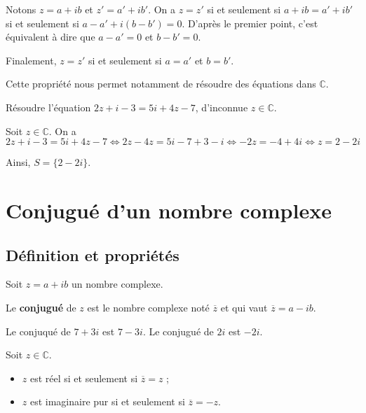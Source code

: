 \documentclass[11pt,fleqn, openany]{book} %
\begin{document}
\begin{demonstration}Notons $z=a+ib$ et $z'=a'+ib'$. On a $z=z'$ si et seulement si $a+ib=a'+ib'$ si et seulement si $a-a'+i(b-b')=0$. D'après le premier point, c'est équivalent à dire que $a-a'=0$ et $b-b'=0$. 

Finalement, $z=z'$ si et seulement si $a=a'$ et $b=b'$.\end{demonstration}

Cette propriété nous permet notamment de résoudre des équations dans $\mathbb{C}$.

\begin{example}Résoudre l'équation $2z+i-3=5i+4z-7$, d'inconnue $z \in \mathbb{C}$.

Soit $z \in \mathbb{C}$. On a
\[2z+i-3=5i+4z-7  \Leftrightarrow  2z-4z = 5i - 7 +3 - i  \Leftrightarrow -2z = -4 +4i  \Leftrightarrow  z = 2 - 2i\]

Ainsi, $S=\{2-2i\}$.

\end{example}


\section{Conjugué d'un nombre complexe}

\subsection{Définition et propriétés}

\begin{definition}Soit $z = a+ib$ un nombre complexe.

Le \textbf{conjugué} de $z$ est le nombre complexe noté $\overline{z}$ et qui vaut $\overline{z}=a-ib$.\end{definition}

\begin{example}Le conjuqué de $7+3i$ est $7-3i$. Le conjugué de $2i$ est $-2i$.\end{example}


\begin{proposition}Soit $z \in \mathbb{C}$.
\begin{itemize}
\item $z$ est réel si et seulement si $\overline{z}=z$ ;
\item $z$ est imaginaire pur si et seulement si $\overline{z}=-z$.
\end{itemize}\end{proposition}
\end{document}
